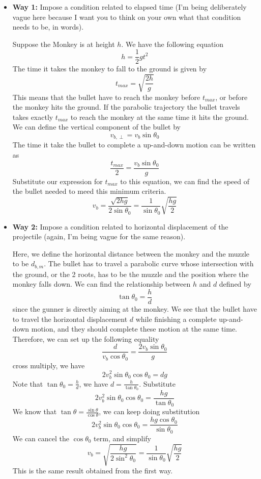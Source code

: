 \documentclass[12pt]{article}
\begin{document}
\begin{itemize}
    \item \textbf{Way 1:} Impose a condition related to elapsed time (I’m being deliberately vague here because I want you to think on your own what that condition needs to be, in words).
    
    Suppose the Monkey is at height $h$. We have the following equation
    \[
    h = \frac{1}{2}gt^2
    \]
    The time it takes the monkey to fall to the ground is given by
    \[
    t_{max} = \sqrt{\frac{2h}{g}}
    \]
    This means that the bullet have to reach the monkey before $t_{max}$, or before the monkey hits the ground. If the parabolic trajectory the bullet travels takes exactly $t_{max}$ to reach the monkey at the same time it hits the ground. We can define the vertical component of the bullet by
    \[
    v_{b,\perp} = v_b\sin\theta_0
    \]
    The time it take the bullet to complete a up-and-down motion can be written as
    \[
    \frac{t_{max}}{2} = \frac{v_b\sin\theta_0}{g}
    \]
    Substitute our expression for $t_{max}$ to this equation, we can find the speed of the bullet needed to meed this minimum criteria.
    \[
    v_b = \frac{\sqrt{2hg}}{2\sin\theta_0} = \frac{1}{\sin\theta_0}\sqrt{\frac{hg}{2}}
    \]

    
    \item \textbf{Way 2:} Impose a condition related to horizontal displacement of the projectile (again, I’m being vague for the same reason).

    Here, we define the horizontal distance between the monkey and the muzzle to be $d_{b,m}$. The bullet has to travel a parabolic curve whose intersection with the ground, or the 2 roots, has to be the muzzle and the position where the monkey falls down. We can find the relationship between $h$ and $d$ defined by 
    \[
    \tan\theta_0 = \frac{h}{d}
    \]
    since the gunner is directly aiming at the monkey. We see that the bullet have to travel the horizontal displacement $d$ while finishing a complete up-and-down motion, and they should complete these motion at the same time. Therefore, we can set up the following equality
    \[
    \frac{d}{v_b\cos\theta_0} = \frac{2v_b\sin\theta_0}{g}
    \]
    cross multiply, we have
    \[
   2 v_b^2\sin\theta_0\cos\theta_0 = dg
    \]
    Note that $\tan\theta_0 = \frac{h}{d}$, we have $d = \frac{h}{\tan\theta_0}$. Substitute
    \[
    2 v_b^2\sin\theta_0\cos\theta_0 = \frac{hg}{\tan\theta_0}
    \]
    We know that $\tan\theta = \frac{\sin\theta}{\cos\theta}$, we can keep doing substitution
    \[
    2 v_b^2\sin\theta_0\cos\theta_0  = \frac{hg\cos\theta_0}{\sin\theta_0}
    \]
    We can cancel the $\cos\theta_0$ term, and simplify
    \[
    v_b = \sqrt{\frac{hg}{2\sin^2\theta_0}} = \frac{1}{\sin\theta_0}\sqrt{\frac{hg}{2}}
    \]
    This is the same result obtained from the first way. 

    
\end{itemize}
\end{document}

